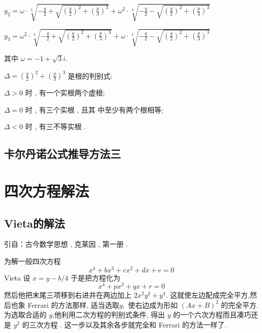 $y_{2}=\omega \cdot \sqrt[3]{-\frac{q}{2}+\sqrt{\left(\frac{q}{2}\right)^{2}+\left(\frac{p}{3}\right)^{3}}}+\omega^{2} \cdot \sqrt[3]{-\frac{q}{2}-\sqrt{\left(\frac{q}{2}\right)^{2}+\left(\frac{p}{3}\right)^{3}}}$

$y_{3}=\omega^{2} \cdot \sqrt[3]{-\frac{q}{2}+\sqrt{\left(\frac{q}{2}\right)^{2}+\left(\frac{p}{3}\right)^{3}}}+\omega \cdot \sqrt[3]{-\frac{q}{2}-\sqrt{\left(\frac{q}{2}\right)^{2}+\left(\frac{p}{3}\right)^{3}}}$

其中 $\omega=-1+\sqrt{3} i$.

$\Delta=\left(\frac{q}{2}\right)^{2}+\left(\frac{p}{3}\right)^{3}$ 是根的判别式: 

$\Delta>0$ 时 , 有一个实根两个虚根; 

$\Delta=0$ 时 , 有三个实根 , 且其 中至少有两个根相等; 

$\Delta<0$ 时 , 有三不等实根 . 

\subsection{卡尔丹诺公式推导方法三}









\section{四次方程解法}



\subsection{Vieta的解法}
引自：古今数学思想 , 克莱因 , 第一册 . 

为解一般四次方程
\[
x^{4}+b x^{3}+c x^{2}+d x+e=0
\]
Vieta 设 $x=y-b / 4$ 于是把方程化为
\[
x^{4}+p x^{2}+q x+r=0
\]
然后他把末尾三项移到右进并在两边加上 $2 x^{2} y^{2}+y^{4} .$ 这就使左边配成完全平方,然后也象 Ferrari 的方法那样, 适当选取$y,$ 使右边成为形如 $(A x+B)^{2}$ 的完全平方. 为选取合适的 $y$,他利用二次方程的判别式条件, 得出 $y$ 的一个六次方程而且凑巧还是 $y^{2}$ 的三次方程 . 这一步以及其余各步就完全和 Ferrari 的方法一样了.




